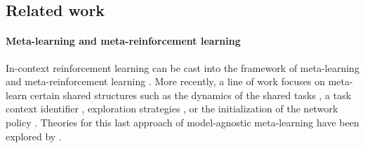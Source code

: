 \documentclass[10pt]{article}
\newcommand{\authnote}[2]{{\scriptsize $\ll$\textsf{#1 notes: #2}$\gg$}}
\newcommand{\authnote}[2]{}
\newcommand{\yub}[1]{{\color{red}\authnote{Yu}{#1}}}
\begin{document}

    
    



\subsection{Related work}\label{sec:related-work}

\paragraph{Meta-learning and meta-reinforcement learning} In-context reinforcement learning can be cast into the framework of meta-learning and meta-reinforcement learning \citep{schmidhuber1987evolutionary, schmidhuber1992learning, bengio1990learning, naik1992meta, ishii2002control, schaul2010metalearning, thrun2012learning}. More recently, a line of work focuses on meta-learn certain shared structures such as the dynamics of the shared tasks \citep{fu2016one, nagabandi2018learning}, a task context identifier \citep{rakelly2019efficient, humplik2019meta, zintgraf2019varibad}, exploration strategies \citep{gupta2018meta}, or the initialization of the network policy \citep{finn2017model, hochreiter2001learning, nichol2018first, rothfuss2018promp}. Theories for this last approach of model-agnostic meta-learning have been explored by \cite{wang2020global}. 
\end{document}
